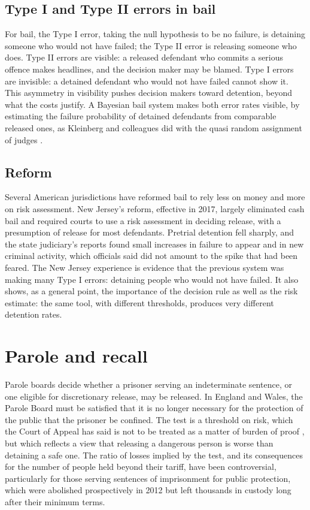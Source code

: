 \subsection{Type I and Type II errors in bail}

For bail, the Type I error, taking the null hypothesis to be no failure, is detaining someone who would not have failed; the Type II error is releasing someone who does. Type II errors are visible: a released defendant who commits a serious offence makes headlines, and the decision maker may be blamed. Type I errors are invisible: a detained defendant who would not have failed cannot show it. This asymmetry in visibility pushes decision makers toward detention, beyond what the costs justify. A Bayesian bail system makes both error rates visible, by estimating the failure probability of detained defendants from comparable released ones, as Kleinberg and colleagues did with the quasi random assignment of judges \citep{kleinberg2018}.

\subsection{Reform}

Several American jurisdictions have reformed bail to rely less on money and more on risk assessment. New Jersey's reform, effective in 2017, largely eliminated cash bail and required courts to use a risk assessment in deciding release, with a presumption of release for most defendants. Pretrial detention fell sharply, and the state judiciary's reports found small increases in failure to appear and in new criminal activity, which officials said did not amount to the spike that had been feared. The New Jersey experience is evidence that the previous system was making many Type I errors: detaining people who would not have failed. It also shows, as a general point, the importance of the decision rule as well as the risk estimate: the same tool, with different thresholds, produces very different detention rates.

\section{Parole and recall}

Parole boards decide whether a prisoner serving an indeterminate sentence, or one eligible for discretionary release, may be released. In England and Wales, the Parole Board must be satisfied that it is no longer necessary for the protection of the public that the prisoner be confined. The test is a threshold on risk, which the Court of Appeal has said is not to be treated as a matter of burden of proof \citep{sim2003}, but which reflects a view that releasing a dangerous person is worse than detaining a safe one. The ratio of losses implied by the test, and its consequences for the number of people held beyond their tariff, have been controversial, particularly for those serving sentences of imprisonment for public protection, which were abolished prospectively in 2012 but left thousands in custody long after their minimum terms.

